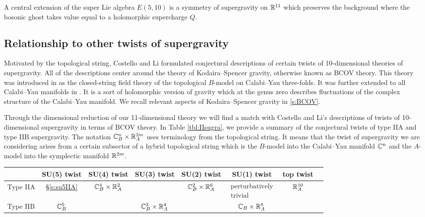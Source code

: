 \begin{conj} 
A central extension of the super Lie algebra $E(5,10)$ is a symmetry of supergravity on $\mathbb R^{11}$ which preserves the background where the bosonic ghost takes value equal to a holomorphic supercharge $Q$.
\end{conj}

\subsection*{Relationship to other twists of supergravity} 

Motivated by the topological string, Costello and Li formulated conjectural descriptions of certain twists of 10-dimensional theories of supergravity. 
All of the descriptions center around the theory of Kodaira--Spencer gravity, otherwise known as BCOV theory. 
This theory was introduced in \cite{BCOV} as the closed-string field theory of the topological $B$-model on Calabi--Yau three-folds.
It was further extended to all Calabi--Yau manifolds in \cite{CLbcov1}. 
It is a sort of holomorphic version of gravity which at the genus zero  describes fluctuations of the complex structure of the Calabi--Yau manifold. 
We recall relevant aspects of Kodaira--Spencer gravity in \ref{s:BCOV}. 

Through the dimensional reduction of our 11-dimensional theory we will find a match with Costello and Li's descriptions of twists of 10-dimensional supergravity in terms of BCOV theory.
In Table \ref{tbl:IIsugra}, we provide a summary of the conjectural twists of type IIA and type IIB supergravity. 
The notation $\mathbb C^n_B \times \mathbb R^{2m}_A$ uses terminology from the topological string. 
It means that the twist of supergravity we are considering arises from a certain subsector of a hybrid topological string which is the $B$-model into the Calabi--Yau manifold $\mathbb C^n$ and the $A$-model into the symplectic manifold $\mathbb R^{2m}$. 

\begin{table}[]
\begin{tabular}{c|c|c|c|c|c|c|c|}
\cline{2-7}
& SU(5) twist & SU(4) twist & SU(3) twist & SU(2) twist & SU(1) twist & top twist  \\ \hline
\multicolumn{1}{|l|}{Type IIA} & \S \ref{s:su5IIA} & $\mathbb C^4_B \times \mathbb R^2_A$ & & $\mathbb C^2_B \times \mathbb R^6_A$ & $\begin{matrix} \text{perturbatively} \\ \text{trivial} \end{matrix}$ & $\mathbb R^{10}_A$  \\ \hline
\multicolumn{1}{|l|}{Type IIB} & $\mathbb C^5_B$ & & $\mathbb C^3_B \times \mathbb R^4_A$ & & $\mathbb C_B \times \mathbb R^8_A$ & \\ \hline
\end{tabular}
\end{table}

